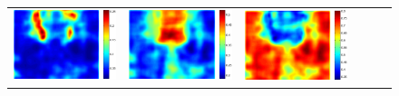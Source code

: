 \documentclass[10pt,twocolumn,letterpaper]{article}
\begin{document}
\begin{figure}[!h]
{\begin{tabular}{c c c c c c}
   \includegraphics[height=0.115\linewidth]{fig/coco/att1/COCO_val2014_000000006847.pdf} &
   \includegraphics[height=0.115\linewidth]{fig/coco/att2/COCO_val2014_000000006847.pdf} &
   \includegraphics[height=0.115\linewidth]{fig/coco/att3/COCO_val2014_000000006847.pdf} \\ 

\end{tabular}}
\end{figure}
\end{document}
